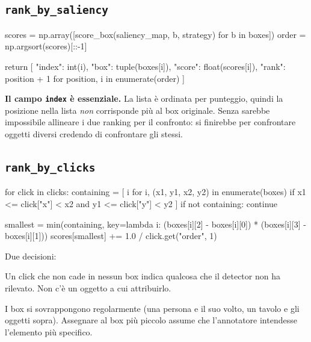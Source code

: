 \subsection{\texttt{rank\_by\_saliency}}

\begin{idebox}
\begin{pycode}
scores = np.array([score_box(saliency_map, b, strategy) for b in boxes])
order = np.argsort(scores)[::-1]

return [
    {"index": int(i), "box": tuple(boxes[i]),
     "score": float(scores[i]), "rank": position + 1}
    for position, i in enumerate(order)
]
\end{pycode}
\end{idebox}

\begin{attenzione}
\textbf{Il campo \texttt{index} è essenziale.} La lista è ordinata per punteggio, quindi la
posizione nella lista \emph{non} corrisponde più al box originale. Senza  sarebbe
impossibile allineare i due ranking per il confronto: si finirebbe per confrontare oggetti
diversi credendo di confrontare gli stessi.
\end{attenzione}

\subsection{\texttt{rank\_by\_clicks}}

\begin{idebox}
\begin{pycode}
for click in clicks:
    containing = [
        i for i, (x1, y1, x2, y2) in enumerate(boxes)
        if x1 <= click["x"] < x2 and y1 <= click["y"] < y2
    ]
    if not containing:
        continue

    smallest = min(containing,
                   key=lambda i: (boxes[i][2] - boxes[i][0]) * (boxes[i][3] - boxes[i][1]))
    scores[smallest] += 1.0 / click.get("order", 1)
\end{pycode}
\end{idebox}

Due decisioni:

\begin{description}[leftmargin=1.2em,style=nextline]
\item[Click nello sfondo: scartati] Un click che non cade in nessun box indica qualcosa che il
detector non ha rilevato. Non c'è un oggetto a cui attribuirlo.

\item[Box sovrapposti: vince il più piccolo] I box si sovrappongono regolarmente (una persona e
il suo volto, un tavolo e gli oggetti sopra). Assegnare al box più piccolo assume che l'annotatore
intendesse l'elemento più specifico.
\end{description}


